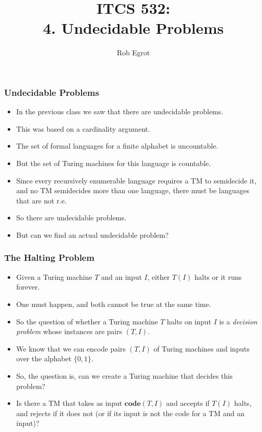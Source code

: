\documentclass[handout]{beamer}
\title{ITCS 532:\\ 
4. Undecidable Problems}
\date{}
\author{Rob Egrot}
\newcommand{\co}{\mathbf{code}}
\begin{document}
\begin{frame}
\titlepage
\end{frame}

\begin{frame}
\frametitle{Undecidable Problems}
\begin{itemize}
\item In the previous class we saw that there are undecidable problems.
\vspace{0.1cm}
\item This was based on a cardinality argument.
\vspace{0.1cm}
\item The set of formal languages for a finite alphabet is uncountable.
\vspace{0.1cm}
\item But the set of Turing machines for this language is countable.
\vspace{0.1cm}
\item Since every recursively enumerable language requires a TM to semidecide it, and no TM semidecides more than one language, there must be languages that are not r.e.
\vspace{0.1cm}
\item So there are undecidable problems.
\vspace{0.1cm}
\item But can we find an actual undecidable problem?
\end{itemize}
\end{frame}

\begin{frame}
\frametitle{The Halting Problem}
\begin{itemize}
\item Given a Turing machine $T$ and an input $I$, either $T(I)$ halts or it runs forever. 
\vspace{0.2cm}
\item One must happen, and both cannot be true at the same time. 
\vspace{0.2cm}
\item So the question of whether a Turing machine $T$ halts on input $I$ is a \emph{decision problem} whose instances are pairs $(T,I)$. 
\vspace{0.2cm}
\item We know that we can encode pairs $(T,I)$ of Turing machines and inputs over the alphabet $\{0,1\}$. 
\vspace{0.2cm}
\item So, the question is, can we create a Turing machine that decides this problem? 
\vspace{0.2cm}
\item Is there a TM that takes as input $\co(T,I)$ and accepts if $T(I)$ halts, and rejects if it does not (or if its input is not the code for a TM and an input)? 
\end{itemize}
\end{frame}
\end{document}
